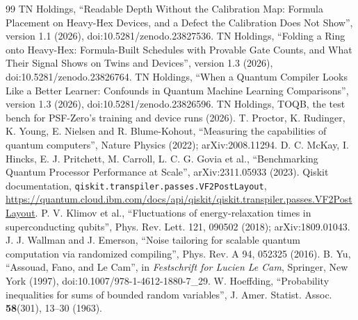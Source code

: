 \documentclass[11pt]{article}
\begin{document}
\begin{thebibliography}{99}
 TN Holdings, ``Readable Depth Without the Calibration Map: Formula Placement on Heavy-Hex Devices,
and a Defect the Calibration Does Not Show'', version 1.1 (2026), doi:10.5281/zenodo.23827536.
 TN Holdings, ``Folding a Ring onto Heavy-Hex: Formula-Built Schedules with Provable Gate Counts, and
What Their Signal Shows on Twins and Devices'', version 1.3 (2026), doi:10.5281/zenodo.23826764.
 TN Holdings, ``When a Quantum Compiler Looks Like a Better Learner: Confounds in Quantum Machine
Learning Comparisons'', version 1.3 (2026), doi:10.5281/zenodo.23826596.
 TN Holdings, TOQB, the test bench for PSF-Zero's training and device runs (2026).
 T. Proctor, K. Rudinger, K. Young, E. Nielsen and R. Blume-Kohout, ``Measuring the capabilities
of quantum computers'', Nature Physics (2022); arXiv:2008.11294.
 D. C. McKay, I. Hincks, E. J. Pritchett, M. Carroll, L. C. G. Govia et al., ``Benchmarking
Quantum Processor Performance at Scale'', arXiv:2311.05933 (2023).
 Qiskit documentation, \texttt{qiskit.transpiler.passes.VF2PostLayout},
\url{https://quantum.cloud.ibm.com/docs/api/qiskit/qiskit.transpiler.passes.VF2PostLayout}.
 P. V. Klimov et al., ``Fluctuations of energy-relaxation times in superconducting qubits'',
Phys. Rev. Lett. 121, 090502 (2018); arXiv:1809.01043.
 J. J. Wallman and J. Emerson, ``Noise tailoring for scalable quantum computation via randomized
compiling'', Phys. Rev. A 94, 052325 (2016).
 B. Yu, ``Assouad, Fano, and Le Cam'', in \emph{Festschrift for Lucien Le Cam}, Springer, New York (1997),
doi:10.1007/978-1-4612-1880-7\_29.
 W. Hoeffding, ``Probability inequalities for sums of bounded random variables'',
J. Amer. Statist. Assoc. \textbf{58}(301), 13--30 (1963).
\end{thebibliography}
\end{document}

